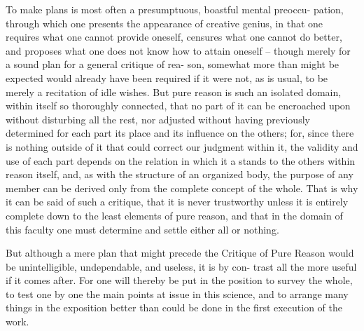 To make plans is most often a presumptuous, boastful mental preoccu-
pation, through which one presents the appearance of creative genius,
in that one requires what one cannot provide oneself, censures what one
cannot do better, and proposes what one does not know how to attain
oneself – though merely for a sound plan for a general critique of rea-
son, somewhat more than might be expected would already have been
required if it were not, as is usual, to be merely a recitation of idle wishes.
But pure reason is such an isolated domain, within itself so thoroughly
connected, that no part of it can be encroached upon without disturbing
all the rest, nor adjusted without having previously determined for each
part its place and its inﬂuence on the others; for, since there is nothing
outside of it that could correct our judgment within it, the validity and
use of each part depends on the relation in which it a stands to the others
within reason itself, and, as with the structure of an organized body, the
purpose of any member can be derived only from the complete concept
of the whole. That is why it can be said of such a critique, that it is never
trustworthy unless it is entirely complete down to the least elements of
pure reason, and that in the domain of this faculty one must determine
and settle either all or nothing.

But although a mere plan that might precede the Critique of Pure
Reason would be unintelligible, undependable, and useless, it is by con-
trast all the more useful if it comes after. For one will thereby be put in
the position to survey the whole, to test one by one the main points at
issue in this science, and to arrange many things in the exposition better
than could be done in the ﬁrst execution of the work.

